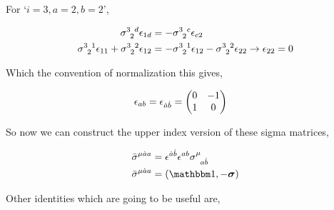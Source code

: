 For `$i=3,a=2,b=2$',

\begin{align}
    \tensor{\sigma}{^3_2^d}\epsilon_{1d}&=-\tensor{\sigma}{^3_2^c}\epsilon_{c2}\nonumber\\
    \tensor{\sigma}{^3_2^1}\epsilon_{11}+\tensor{\sigma}{^3_2^2}\epsilon_{12}&=-\tensor{\sigma}{^3_2^1}\epsilon_{12}-\tensor{\sigma}{^3_2^2}\epsilon_{22}\rightarrow\epsilon_{22}=0\nonumber
\end{align}

Which the convention of normalization this gives,

\begin{align}
    \epsilon_{ab}=\epsilon_{\dot a \dot b}&=\mqty(0&-1\\1&0)\nonumber
\end{align}

So now we can construct the upper index version of these sigma matrices,

\begin{align}
    \tensor{{\bar\sigma}}{^\mu^{\dot a}^a}&=\epsilon^{\dot a\dot b}\epsilon^{a b}\tensor{\sigma}{^\mu_ a_{\dot b}}\nonumber\\
    \tensor{{\bar\sigma}}{^\mu^{\dot a}^a}&=\qty(\mathbbm 1,-\boldsymbol\sigma)\nonumber
\end{align}

Other identities which are going to be useful are,


